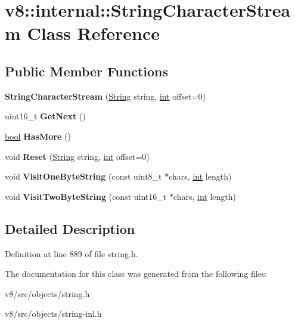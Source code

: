 \hypertarget{classv8_1_1internal_1_1StringCharacterStream}{}\section{v8\+:\+:internal\+:\+:String\+Character\+Stream Class Reference}
\label{classv8_1_1internal_1_1StringCharacterStream}
\subsection*{Public Member Functions}
\begin{DoxyCompactItemize}
\item 
\mbox{\label{classv8_1_1internal_1_1StringCharacterStream_aaeafcbdba5fbf1c302c0343bc9ad2e14}} 
{\bfseries String\+Character\+Stream} (\mbox{\hyperlink{classv8_1_1internal_1_1String}{String}} string, \mbox{\hyperlink{classint}{int}} offset=0)
\item 
\mbox{\label{classv8_1_1internal_1_1StringCharacterStream_a78769916c2be83815a1a5b1a849d73fe}} 
uint16\+\_\+t {\bfseries Get\+Next} ()
\item 
\mbox{\label{classv8_1_1internal_1_1StringCharacterStream_a5f6356cddd0737cffccb427d703009b0}} 
\mbox{\hyperlink{classbool}{bool}} {\bfseries Has\+More} ()
\item 
\mbox{\label{classv8_1_1internal_1_1StringCharacterStream_aaf03b5a2b67547e787da536b5ff69a86}} 
void {\bfseries Reset} (\mbox{\hyperlink{classv8_1_1internal_1_1String}{String}} string, \mbox{\hyperlink{classint}{int}} offset=0)
\item 
\mbox{\label{classv8_1_1internal_1_1StringCharacterStream_abe0d02d44289edc138b56869b7d04ae3}} 
void {\bfseries Visit\+One\+Byte\+String} (const uint8\+\_\+t $\ast$chars, \mbox{\hyperlink{classint}{int}} length)
\item 
\mbox{\label{classv8_1_1internal_1_1StringCharacterStream_acff2c676fd4a935932defc454e3518f5}} 
void {\bfseries Visit\+Two\+Byte\+String} (const uint16\+\_\+t $\ast$chars, \mbox{\hyperlink{classint}{int}} length)
\end{DoxyCompactItemize}


\subsection{Detailed Description}


Definition at line 889 of file string.\+h.



The documentation for this class was generated from the following files\+:\begin{DoxyCompactItemize}
\item 
v8/src/objects/string.\+h\item 
v8/src/objects/string-\/inl.\+h\end{DoxyCompactItemize}

